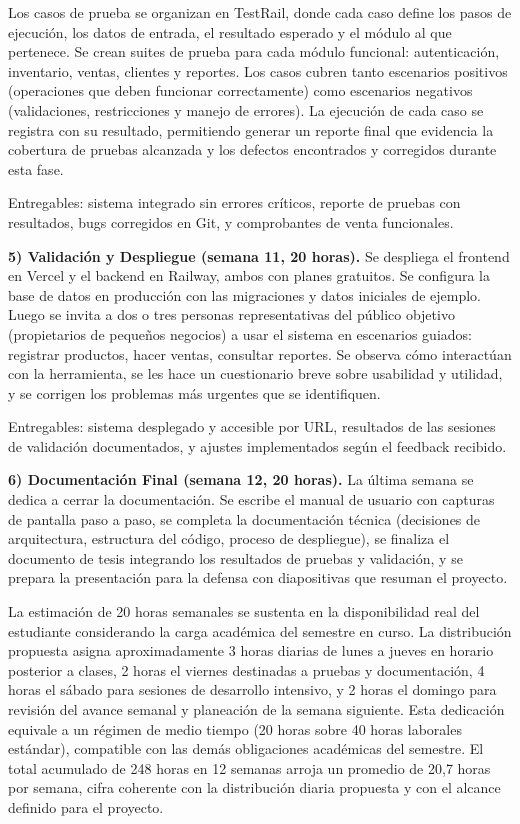 \documentclass[spanish]{ieee_upb}
\begin{document}
Los casos de prueba se organizan en TestRail, donde cada caso define los pasos de ejecución, los datos de entrada, el resultado esperado y el módulo al que pertenece. Se crean suites de prueba para cada módulo funcional: autenticación, inventario, ventas, clientes y reportes. Los casos cubren tanto escenarios positivos (operaciones que deben funcionar correctamente) como escenarios negativos (validaciones, restricciones y manejo de errores). La ejecución de cada caso se registra con su resultado, permitiendo generar un reporte final que evidencia la cobertura de pruebas alcanzada y los defectos encontrados y corregidos durante esta fase.

Entregables: sistema integrado sin errores críticos, reporte de pruebas con resultados, bugs corregidos en Git, y comprobantes de venta funcionales.

\textbf{5) Validación y Despliegue (semana 11, 20 horas).} Se despliega el frontend en Vercel y el backend en Railway, ambos con planes gratuitos. Se configura la base de datos en producción con las migraciones y datos iniciales de ejemplo. Luego se invita a dos o tres personas representativas del público objetivo (propietarios de pequeños negocios) a usar el sistema en escenarios guiados: registrar productos, hacer ventas, consultar reportes. Se observa cómo interactúan con la herramienta, se les hace un cuestionario breve sobre usabilidad y utilidad, y se corrigen los problemas más urgentes que se identifiquen.

Entregables: sistema desplegado y accesible por URL, resultados de las sesiones de validación documentados, y ajustes implementados según el feedback recibido.

\textbf{6) Documentación Final (semana 12, 20 horas).} La última semana se dedica a cerrar la documentación. Se escribe el manual de usuario con capturas de pantalla paso a paso, se completa la documentación técnica (decisiones de arquitectura, estructura del código, proceso de despliegue), se finaliza el documento de tesis integrando los resultados de pruebas y validación, y se prepara la presentación para la defensa con diapositivas que resuman el proyecto.

La estimación de 20 horas semanales se sustenta en la disponibilidad real del estudiante considerando la carga académica del semestre en curso. La distribución propuesta asigna aproximadamente 3 horas diarias de lunes a jueves en horario posterior a clases, 2 horas el viernes destinadas a pruebas y documentación, 4 horas el sábado para sesiones de desarrollo intensivo, y 2 horas el domingo para revisión del avance semanal y planeación de la semana siguiente. Esta dedicación equivale a un régimen de medio tiempo (20 horas sobre 40 horas laborales estándar), compatible con las demás obligaciones académicas del semestre. El total acumulado de 248 horas en 12 semanas arroja un promedio de 20,7 horas por semana, cifra coherente con la distribución diaria propuesta y con el alcance definido para el proyecto.
\end{document}
